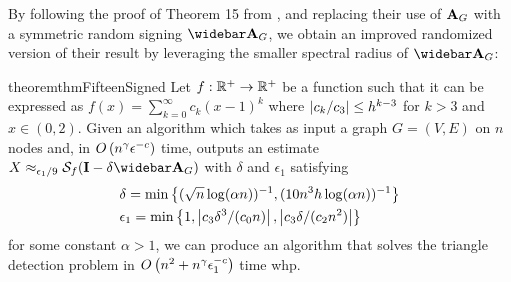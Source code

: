 By following the proof of Theorem 15 from \cite{musco2017spectrum}, and replacing their use of $\mathbf{A}_G$ with a symmetric random signing $\As_G$, we obtain an improved randomized version of their result by leveraging the smaller spectral radius of $\As_G$: 
\begin{restatable}{theorem}{thmFifteenSigned}\label{thm:thm15_signed}
Let $f:\mathbb{R}^+ \to \mathbb{R}^+$ be a function such that it can be expressed as $f(x) = \sum_{k=0}^\infty c_k (x - 1)^k$ where $\left| c_k/c_3 \right| \leq h^{k-3}$ for $k > 3$ and $x \in (0,2)$. Given an algorithm which takes as input a graph $G = (V, E)$ on $n$ nodes and, in $O\left( n^\gamma \epsilon^{-c} \right)$ time, outputs an estimate $X \approx_{\epsilon_1/9} \mathcal{S}_f(\I - \delta \As_G)$ with $\delta$ and $\epsilon_1$ satisfying 
\begin{align*}
    &\delta = \min\left\{ ({\sqrt{n} \log (\alpha n)})^{-1}, ({10n^3 h \log (\alpha n)})^{-1} \right\}\\
    &\epsilon_1 = \min\left\{ 1, \left| {c_3 \delta^3}/{(c_0 n)} \right|, \left| {c_3 \delta}/{(c_2 n^2)} \right| \right\}
\end{align*} 
for some constant $\alpha>1$, we can produce an algorithm that solves the triangle detection problem in $O\left( n^2 + n^\gamma \epsilon_1^{-c} \right)$ time whp.
\end{restatable}
